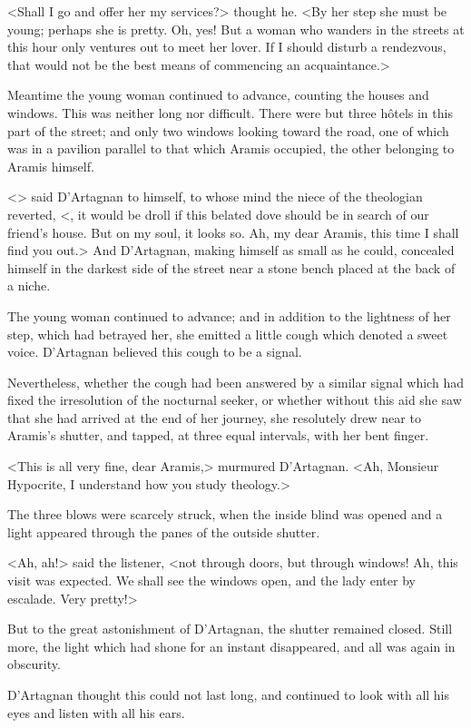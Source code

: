 <Shall I go and offer her my services?> thought he. <By her step she must be young; perhaps she is pretty. Oh, yes! But a woman who wanders in the streets at this hour only ventures out to meet her lover. If I should disturb a rendezvous, that would not be the best means of commencing an acquaintance.> 

Meantime the young woman continued to advance, counting the houses and windows. This was neither long nor difficult. There were but three hôtels in this part of the street; and only two windows looking toward the road, one of which was in a pavilion parallel to that which Aramis occupied, the other belonging to Aramis himself. 

<> said D'Artagnan to himself, to whose mind the niece of the theologian reverted, <, it would be droll if this belated dove should be in search of our friend's house. But on my soul, it looks so. Ah, my dear Aramis, this time I shall find you out.> And D'Artagnan, making himself as small as he could, concealed himself in the darkest side of the street near a stone bench placed at the back of a niche. 

The young woman continued to advance; and in addition to the lightness of her step, which had betrayed her, she emitted a little cough which denoted a sweet voice. D'Artagnan believed this cough to be a signal. 

Nevertheless, whether the cough had been answered by a similar signal which had fixed the irresolution of the nocturnal seeker, or whether without this aid she saw that she had arrived at the end of her journey, she resolutely drew near to Aramis's shutter, and tapped, at three equal intervals, with her bent finger. 

<This is all very fine, dear Aramis,> murmured D'Artagnan. <Ah, Monsieur Hypocrite, I understand how you study theology.> 

The three blows were scarcely struck, when the inside blind was opened and a light appeared through the panes of the outside shutter. 

<Ah, ah!> said the listener, <not through doors, but through windows! Ah, this visit was expected. We shall see the windows open, and the lady enter by escalade. Very pretty!> 

But to the great astonishment of D'Artagnan, the shutter remained closed. Still more, the light which had shone for an instant disappeared, and all was again in obscurity. 

D'Artagnan thought this could not last long, and continued to look with all his eyes and listen with all his ears. 

